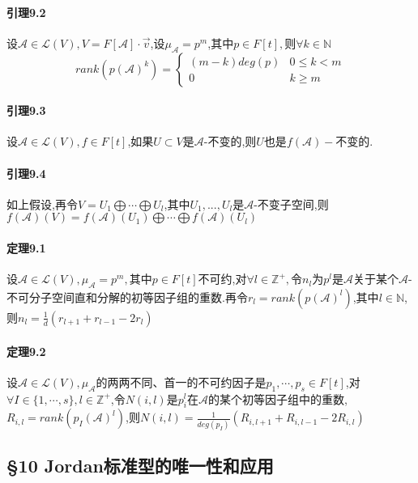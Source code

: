 \documentclass{ctexart}
\begin{document}
\paragraph{引理9.2}
设$\mathcal{A} \in \mathcal{L}(V),V=F[\mathcal{A}]\cdot \vec{v}$,设$\mu_{\mathcal{A}} = p^{m}$,其中$p\in F[t],$则$\forall k \in \mathbb{N}$\\

$$
rank(p(\mathcal{A})^{k})=
\begin{cases}
(m-k)deg(p) &  0 \leq k < m\\
0 & k \geq m
\end{cases}$$

\paragraph{引理9.3}
设$\mathcal{A} \in \mathcal{L}(V),f \in F[t]$,如果$U \subset V$是$\mathcal{A}$-不变的,则$U$也是$f(\mathcal{A})-$不变的.

\paragraph{引理9.4}
如上假设,再令$V =  U_{1} \bigoplus \cdots \bigoplus U_{l}$,其中$U_{1},...,U_{l}$是$\mathcal{A}$-不变子空间,则$f(\mathcal{A})(V) = f(\mathcal{A})(U_{1}) \bigoplus \cdots \bigoplus f(\mathcal{A})(U_{l})$



\paragraph{定理9.1}

设$\mathcal{A} \in \mathcal{L}(V),\mu_{\mathcal{A}}=p^{m},$其中$p \in F[t]$不可约,对$\forall l \in \mathbb{Z}^{+},$令$n_{l}$为$p^{l}$是$\mathcal{A}$关于某个$\mathcal{A}$-不可分子空间直和分解的初等因子组的重数.再令$r_{l}=rank(p(\mathcal{A})^{l})$,其中$l \in \mathbb{N}$,则$n_{l}=\frac{1}{d}(r_{l+1}+r_{l-1}-2r_{l})$

\paragraph{定理9.2}
设$\mathcal{A} \in \mathcal{L}(V),\mu_{\mathcal{A}}$的两两不同、首一的不可约因子是$p_{1},\cdots,p_{s} \in F[t]$,对$\forall I \in \{1,\cdots,s\},l \in \mathbb{Z}^{+}$,令$N(i,l)$是$p^{l}_{i}$在$\mathcal{A}$的某个初等因子组中的重数,$R_{i,l} = rank(p_{I}(\mathcal{A})^{l})$,则$N(i,l)= \frac{1}{deg(p_{I})}(R_{i,l+1}+R_{i,l-1}-2R_{i,l})$

\subsection{§10 Jordan标准型的唯一性和应用}


\ifx\total\undefined
\end{document}
